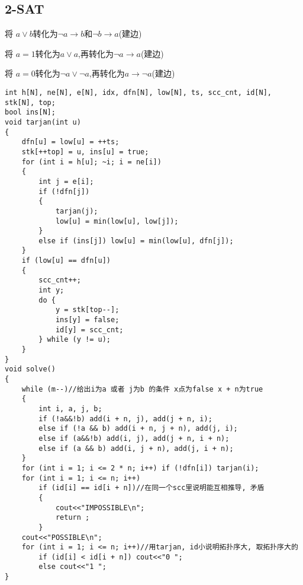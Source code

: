 \documentclass[a4paper,fontset=none]{ctexart}
\begin{document}
\subsection{2-SAT}

将 $a\lor b$转化为$\neg a\rightarrow b$和$\neg b\rightarrow a$(建边)

将 $a=1$转化为$a\lor a$,再转化为$\neg a\rightarrow a$(建边)

将 $a=0$转化为$\neg a \lor \neg a$,再转化为$a\rightarrow \neg a$(建边)

\begin{verbatim}
int h[N], ne[N], e[N], idx, dfn[N], low[N], ts, scc_cnt, id[N], stk[N], top;
bool ins[N];
void tarjan(int u)
{
    dfn[u] = low[u] = ++ts;
    stk[++top] = u, ins[u] = true;
    for (int i = h[u]; ~i; i = ne[i])
    {
        int j = e[i];
        if (!dfn[j])
        {
            tarjan(j);
            low[u] = min(low[u], low[j]);
        }
        else if (ins[j]) low[u] = min(low[u], dfn[j]);
    }
    if (low[u] == dfn[u])
    {
        scc_cnt++;
        int y;
        do {
            y = stk[top--];
            ins[y] = false;
            id[y] = scc_cnt;
        } while (y != u);
    }
}
void solve()
{
    while (m--)//给出i为a 或者 j为b 的条件 x点为false x + n为true
    {
        int i, a, j, b;
        if (!a&&!b) add(i + n, j), add(j + n, i);
        else if (!a && b) add(i + n, j + n), add(j, i);
        else if (a&&!b) add(i, j), add(j + n, i + n);
        else if (a && b) add(i, j + n), add(j, i + n);
    }
    for (int i = 1; i <= 2 * n; i++) if (!dfn[i]) tarjan(i);
    for (int i = 1; i <= n; i++)
        if (id[i] == id[i + n])//在同一个scc里说明能互相推导, 矛盾
        {
            cout<<"IMPOSSIBLE\n";
            return ;
        }
    cout<<"POSSIBLE\n";
    for (int i = 1; i <= n; i++)//用tarjan, id小说明拓扑序大, 取拓扑序大的
        if (id[i] < id[i + n]) cout<<"0 ";
        else cout<<"1 ";
}
\end{verbatim}
\end{document}
